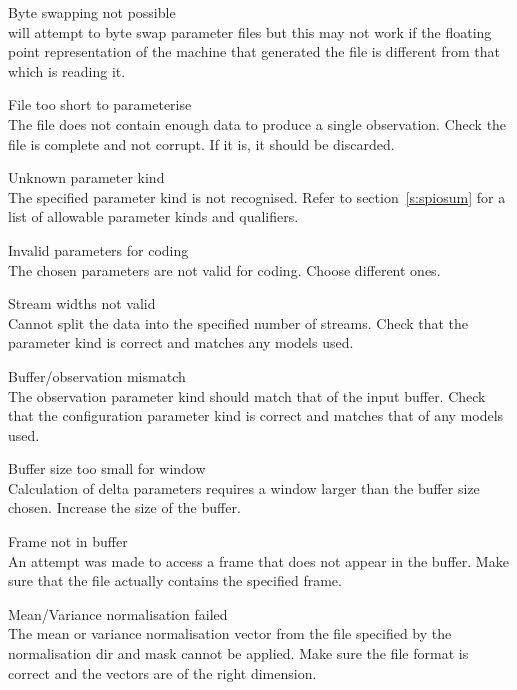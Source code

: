 \begin{itemize}
\begin{itemize}
    Byte swapping not possible\\
         will attempt to byte swap parameter files but this 
        may not work if the floating point representation of the machine 
        that generated the file is different from that which is reading it.

    File too short to parameterise\\
        The file does not contain enough data to produce a single observation.
        Check the file is complete and not corrupt.  If it is, it should be 
        discarded.

    Unknown parameter kind\\
        The specified parameter kind is not recognised.  Refer to 
        section~\ref{s:spiosum} for a list of allowable parameter kinds
        and qualifiers.

    Invalid parameters for coding\\
        The chosen parameters are not valid for coding.  Choose different ones.

    Stream widths not valid\\
        Cannot split the data into the specified number of streams.  Check that
        the parameter kind is correct and matches any models used.

    Buffer/observation mismatch\\
        The observation parameter kind should match that of the input buffer.
        Check that the configuration parameter kind is correct and matches 
        that of any models used.

    Buffer size too small for window\\
        Calculation of delta parameters requires a window larger than the
        buffer size chosen.  Increase the size of the buffer.

    Frame not in buffer\\
        An attempt was made to access a frame that does not appear in the 
        buffer.  Make sure that the file actually contains the specified frame.

    Mean/Variance normalisation failed\\
        The mean or variance normalisation vector from the file
        specified by the normalisation dir and mask cannot be applied.
        Make sure the file format is correct and the vectors are of
        the right dimension.


\end{itemize}
\end{itemize}
